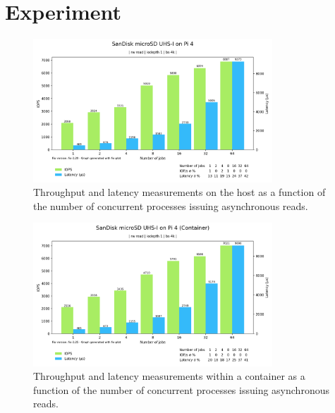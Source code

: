 \chapter{Experiment}
\label{ch:Experiment}

\clearpage

\begin{figure}[H]
    \centering
    \includegraphics[width=0.8\textwidth]{images/results/sandisk-host-libaio-read-numjobs-iops-latency.png}
    \caption{Throughput and latency measurements on the host as a function of the number of concurrent processes issuing asynchronous reads.}
    \label{images:fundamentals/net-ns-veth-arch.jpg}
\end{figure}

\begin{figure}[H]
    \centering
    \includegraphics[width=0.8\textwidth]{images/results/sandisk-libaio-read-numjobs-iops-latency.png}
    \caption{Throughput and latency measurements within a container as a function of the number of concurrent processes issuing asynchronous reads.}
    \label{images:fundamentals/net-ns-veth-arch.jpg}
\end{figure}

